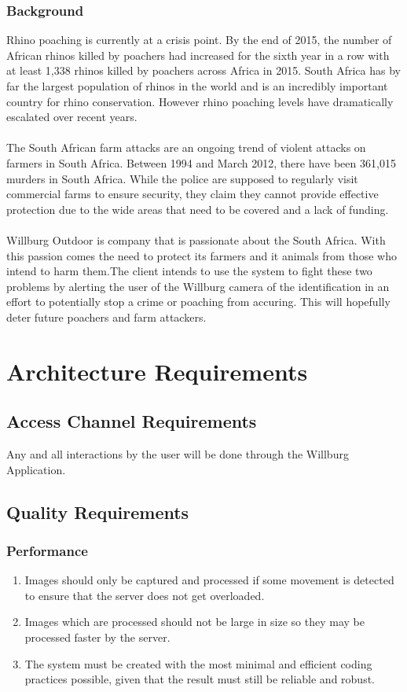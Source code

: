 \documentclass[a4paper,12pt]{report}
\begin{document}
\subsubsection{Background}
Rhino poaching is currently at a crisis point. By the end of 2015, the number of African rhinos killed by poachers had increased for the sixth year in a row with at least 1,338 rhinos killed by poachers across Africa in 2015. South Africa has by far the largest population of rhinos in the world and is an incredibly important country for rhino conservation. However rhino poaching levels have dramatically escalated over recent years. \\
\\The South African farm attacks are an ongoing trend of violent attacks on farmers in South Africa. Between 1994 and March 2012, there have been 361,015 murders in South Africa. While the police are supposed to regularly visit commercial farms to ensure security, they claim they cannot provide effective protection due to the wide areas that need to be covered and a lack of funding.\\
\\Willburg Outdoor is company that is passionate about the South Africa. With this passion comes the need to protect its farmers and it animals from those who intend to harm them.The client intends to use the system to fight these two problems by alerting the user of the Willburg camera of the identification in an effort to potentially stop a crime or poaching from accuring. This will hopefully deter future poachers and farm attackers.
	
\section{Architecture Requirements}
\subsection{Access Channel Requirements}
Any and all interactions by the user will be done through the Willburg Application.
\subsection{Quality Requirements}
\subsubsection{Performance}
\begin{enumerate}
	\item Images should only be captured and processed if some movement is detected to ensure that the server does not get overloaded.
	\item Images which are processed should not be large in size so they may be processed faster by the server.
	\item The system must be created with the most minimal and efficient coding
	practices possible, given that the result must still be reliable and robust.
\end{enumerate}
\end{document}
